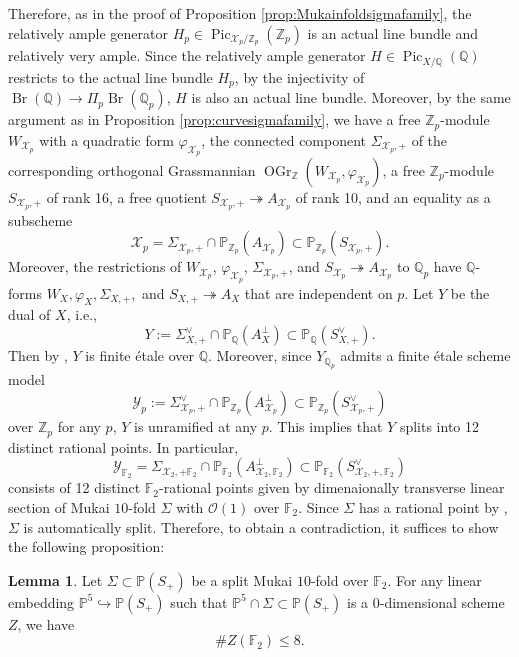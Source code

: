 \documentclass[autodetect-engine, a4paper]{amsart}
\theoremstyle{definition}
\newtheorem{lem}[thm]{Lemma}
\def\F{{\mathbb F}}
\def\P{{\mathbb P}}
\def\Q{{\mathbb Q}}
\def\Z{{\mathbb Z}}
\def\cO{\mathcal{O}}
\DeclareMathOperator\Pic{\mathrm{Pic}}
\DeclareMathOperator\OGr{\mathrm{OGr}}
\DeclareMathOperator\Br{\mathrm{Br}}
\begin{document}
Therefore, as in the proof of Proposition \ref{prop:Mukainfoldsigmafamily}, the relatively ample generator $H_{p} \in \Pic_{\mathcal{X}_{p}/\Z_p} (\Z_{p})$ is an actual line bundle and relatively very ample.
Since the relatively ample generator $H \in \Pic_{X/\Q} (\Q)$ restricts to the actual line bundle $H_{p}$, by the injectivity of $\Br(\Q) \rightarrow \Pi_{p} \Br (\Q_{p})$, $H$ is also an actual line bundle. 
Moreover, by the same argument as in Proposition \ref{prop:curvesigmafamily}, we have a free $\Z_{p}$-module $W_{\mathcal{X}_{p}}$ with a quadratic form $\varphi_{\mathcal{X}_{p}}$,
the connected component $\Sigma_{\mathcal{X}_{p},+}$ of the corresponding orthogonal Grassmannian $\OGr_{\Z} (W_{\mathcal{X}_{p}}, \varphi_{\mathcal{X}_{p}})$,
a free $\Z_p$-module $S_{\mathcal{X}_{p},+}$ of rank 16, a free quotient $S_{\mathcal{X}_{p}, +} \twoheadrightarrow A_{\mathcal{X}_{p}}$ of rank 10, and an equality as a subscheme
\[
\mathcal{X}_{p} = \Sigma_{\mathcal{X}_{p},+} \cap \P_{\Z_p} (A_{\mathcal{X}_{p}}) \subset \P_{\Z_p} (S_{\mathcal{X}_{p},+}). 
\]
Moreover, the restrictions of $W_{\mathcal{X}_{p}}$, $\varphi_{\mathcal{X}_{p}}$, $\Sigma_{\mathcal{X}_{p}, +}$, and $S_{\mathcal{X}_{p}} \twoheadrightarrow A_{\mathcal{X}_{p}}$ to $\Q_{p}$ have $\Q$-forms $W_{X}, \varphi_{X}, \Sigma_{X,+},$ and $S_{X,+} \twoheadrightarrow A_{X}$ that are independent on $p$.
Let $Y$ be the dual of $X$, i.e.,
\[
Y := \Sigma_{X,+}^{\vee} \cap \P_{\Q} (A_{X}^{\perp}) \subset \P_{\Q} (S_{X,+}^{\vee}).
\]
Then by \cite[Lemma 3.3]{Kuznetsovspinor}, $Y$ is finite \'{e}tale over $\Q$.
Moreover, since $Y_{\Q_{p}}$ admits a finite \'{e}tale scheme model  
\[
\mathcal{Y}_{p} := \Sigma_{\mathcal{X}_{p},+}^{\vee} \cap \P_{\Z_{p}} (A_{\mathcal{X}_p}^{\perp}) \subset \P_{\Z_p} (S_{\mathcal{X}_p,+}^{\vee})
\]
over $\Z_p$ for any $p$, $Y$ is unramified at any $p$.
This implies that $Y$ splits into 12 distinct rational points.
In particular, 
\[
\mathcal{Y}_{\F_{2}} = \Sigma_{\mathcal{X}_2,+ \F_{2}} \cap \P_{\F_{2}} (A_{\mathcal{X}_2, \F_{2}}^{\perp}) \subset \P_{\F_{2}} (S_{\mathcal{X}_2,+,\F_{2}}^{\vee})
\]
consists of 12 distinct $\F_2$-rational points given by dimenaionally transverse linear section of Mukai $10$-fold $\Sigma$ with $\cO(1)$ over $\F_{2}$.
Since $\Sigma$ has a rational point by \cite{Esnault}, $\Sigma$ is automatically split.
Therefore, to obtain a contradiction, it suffices to show the following proposition:

\begin{lem}
\label{lem:vectorF2}
Let $\Sigma \subset \P(S_{+})$ be a split Mukai $10$-fold over $\F_{2}$.
For any linear embedding $\P^{5} \hookrightarrow  \P (S_{+})$ such that $\P^5 \cap \Sigma \subset \P(S_{+})$ is a $0$-dimensional scheme $Z$, we have
\[
\# Z (\F_{2}) \leq 8.
\]
\end{lem}
\end{document}
